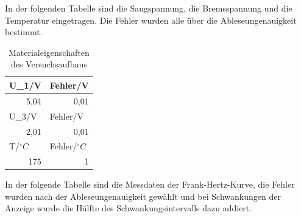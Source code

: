 \documentclass[12pt,a4paper]{article}
\begin{document}
In der folgenden Tabelle sind die Saugspannung, die Bremsspannung und die Temperatur eingetragen. Die Fehler wurden alle über die Ableseungenauigkeit bestimmt.

\begin{table}[H]
\caption{Materialeigenschaften des Versuchsaufbaus}
\begin{center}
\begin{tabular}{|l|l|}
\hline
U\_1/V & Fehler/V \\ \hline
\multicolumn{1}{|r|}{5,04} & \multicolumn{1}{r|}{0,01} \\ \hline
U\_3/V & Fehler/V \\ \hline
\multicolumn{1}{|r|}{2,01} & \multicolumn{1}{r|}{0,01} \\ \hline
T/$^\circ C$ & Fehler/$^\circ C$ \\ \hline
\multicolumn{1}{|r|}{175} & \multicolumn{1}{r|}{1} \\ \hline
\end{tabular}
\end{center}
\label{tab:eingenschaften}
\end{table}

In der folgende Tabelle sind die Messdaten der Frank-Hertz-Kurve, die Fehler wurden nach der Ableseungenauigkeit gewählt und bei Schwankungen der Anzeige wurde die Hälfte des Schwankungsintervalls dazu addiert.
\end{document}
